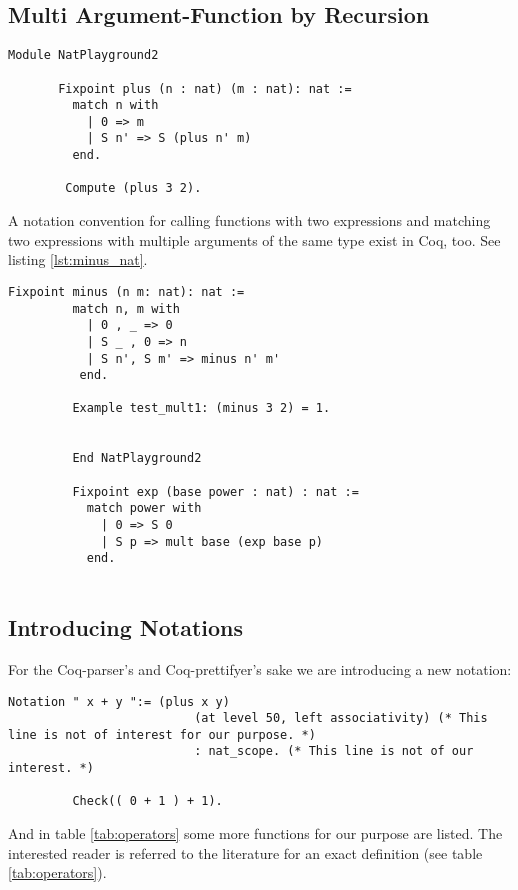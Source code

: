 	   
   \subsection{Multi Argument-Function by Recursion}
	   
	   \begin{lstlisting}[caption = \lstinline!plus!, label=lst:plus]
	   Module NatPlayground2
	   
	   Fixpoint plus (n : nat) (m : nat): nat :=
	     match n with
	       | 0 => m
	       | S n' => S (plus n' m)
	     end.
	     
	    Compute (plus 3 2).
	   \end{lstlisting}   
	    A notation convention for calling functions with two expressions and matching two expressions with multiple arguments of the same type exist in Coq, too. 
	    See listing \ref{lst:minus_nat}.
	    
	   \begin{lstlisting}[label = lst:minus_nat, caption={ \lstinline!minus! and \lstinline!exp!}]
	    Fixpoint minus (n m: nat): nat :=
	     match n, m with
	       | 0 , _ => 0
	       | S _ , 0 => n
	       | S n', S m' => minus n' m'
	      end.
	      
	     Example test_mult1: (minus 3 2) = 1.
	     
	      
	     End NatPlayground2
	     
	     Fixpoint exp (base power : nat) : nat :=
	       match power with
	         | 0 => S 0
	         | S p => mult base (exp base p)
	       end.
	         
	   \end{lstlisting}
	   
   \subsection{Introducing Notations}
	
	    For the Coq-parser's and Coq-prettifyer's sake we are introducing a new notation:
	    
	    \begin{lstlisting}[caption= operator overloading of \lstinline!+!] 
	     Notation " x + y ":= (plus x y)
	                      (at level 50, left associativity) (* This line is not of interest for our purpose. *)
	                      : nat_scope. (* This line is not of our interest. *)
	                      
	     Check(( 0 + 1 ) + 1).
	    \end{lstlisting}    
	   And in table \ref{tab:operators} some more functions for our purpose are listed.
	   The interested reader is referred to the literature for an exact definition (see table \ref{tab:operators}).  
	   
